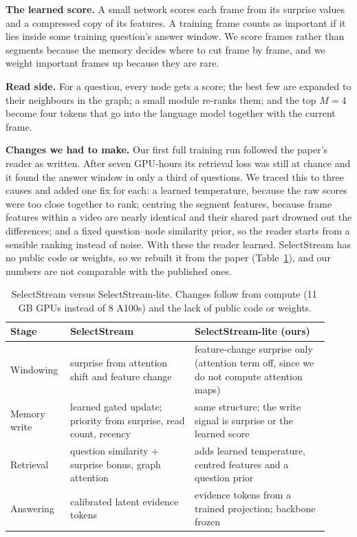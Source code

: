 \documentclass[11pt,a4paper]{article}
\begin{document}
\textbf{The learned score.} A small network scores each frame from its surprise values and a compressed copy of its
features. A training frame counts as important if it lies inside some training question's answer window. We score frames
rather than segments because the memory decides where to cut frame by frame, and we weight important frames up because
they are rare.

\textbf{Read side.} For a question, every node gets a score; the best few are expanded to their neighbours in the graph; a
small module re-ranks them; and the top $M=4$ become four tokens that go into the language model together with the current
frame.

\textbf{Changes we had to make.} Our first full training run followed the paper's reader as written. After seven
GPU-hours its retrieval loss was still at chance and it found the answer window in only a third of questions. We traced
this to three causes and added one fix for each: a learned temperature, because the raw scores were too close together to
rank; centring the segment features, because frame features within a video are nearly identical and their shared part
drowned out the differences; and a fixed question--node similarity prior, so the reader starts from a sensible ranking
instead of noise. With these the reader learned. SelectStream has no public code or weights, so we rebuilt it from the paper
(Table~\ref{tab:lite}), and our numbers are not comparable with the published ones.

\begin{table}[t]\centering\small
\caption{SelectStream versus SelectStream-lite. Changes follow from compute (11\,GB GPUs instead of 8 A100s) and the lack of
public code or weights.}\label{tab:lite}
\begin{tabular}{p{0.15\linewidth}p{0.37\linewidth}p{0.4\linewidth}}
\toprule
Stage & SelectStream~\cite{selectstream} & SelectStream-lite (ours) \\
\midrule
Windowing & surprise from attention shift and feature change & feature-change surprise only (attention term off, since we do not compute attention maps) \\
Memory write & learned gated update; priority from surprise, read count, recency & same structure; the write signal is surprise or the learned score \\
Retrieval & question similarity + surprise bonus, graph attention & adds learned temperature, centred features and a question prior \\
Answering & calibrated latent evidence tokens & evidence tokens from a trained projection; backbone frozen \\
\bottomrule
\end{tabular}
\end{table}
\end{document}
